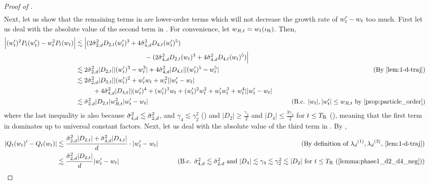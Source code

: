 \begin{proof}[Proof of ]
\begin{align}
\end{align}
Next, let us show that the remaining terms in  are lower-order terms which will not decrease the growth rate of $w_t' - w_t$ too much. First let us deal with the absolute value of the second term in . For convenience, let $w_{R, t} = w_t(\iota_{\textup{R}})$. Then,
\begin{align}
\Big|(\w_t')^2 P_t(\w_t') - \w_t^2 P_t(\w_t) \Big|
& \lesssim \Big| (2 \sigmaCoeffTwo^2 D_{2, t} (\w_t')^3 + 4 \sigmaCoeffFour^2 D_{4, t} (\w_t')^5 ) \\
& \nextlinespace\nextlinespace\nextlinespace\nextlinespace - (2 \sigmaCoeffFour^2 D_{2, t} (\w_t)^3 + 4 \sigmaCoeffFour^2 D_{4, t} (\w_t)^5 ) \Big| \\
& \lesssim 2 \sigmaCoeffTwo^2 |D_{2, t}| |(\w_t')^3 - \w_t^3| + 4 \sigmaCoeffFour^2 |D_{4, t}| |(\w_t')^5 - \w_t^5|
& \tag{By \Cref{lem:1-d-traj}} \\
& \lesssim 2 \sigmaCoeffTwo^2 |D_{2, t}| |(\w_t')^2 + \w_t' \w_t + \w_t^2| |\w_t' - \w_t| \\
& \nextlinespace + 4 \sigmaCoeffFour^2 |D_{4, t}| |(\w_t')^4 + (\w_t')^3 \w_t + (\w_t')^2 \w_t^2 + \w_t' \w_t^3 + \w_t^4| |\w_t' - \w_t| \label{eq:with_third_term} \\
& \lesssim \sigmaCoeffTwo^2 |D_{2, t}| \w_{R, t}^2 |\w_t' - \w_t|
& \tag{B.c. $|\w_t|, |\w_t'| \leq \w_{R, t}$ by \Cref{prop:particle_order}}
\end{align}
where the last inequality is also because $\hat{\sigma}_{4, d}^2 \lesssim \hat{\sigma}_{2, d}^2$, and $\gamma_4 \lesssim \gamma_2^2$ () and $|D_2| \geq \frac{\gamma_2}{2}$ and $|D_4| \leq \frac{3\gamma_4}{2}$ for $t \leq {T_{\textup{R}}}$ (), meaning that the first term in  dominates up to universal constant factors. Next, let us deal with the absolute value of the third term in . By ,
\begin{align}
|Q_t(\w_t)' - Q_t(\w_t)|
& \lesssim \frac{\sigmaCoeffTwo^2 |D_{2, t}| + \sigmaCoeffFour^2 |D_{4, t}|}{d} \cdot |\w_t' - \w_t|
& \tag{By definition of $\lambdaD^{(1)}, \lambdaD^{(3)}$, \Cref{lem:1-d-traj}} \\
& \lesssim \frac{\sigmaCoeffTwo^2 |D_{2, t}|}{d} |\w_t' - \w_t|
& \tag{B.c. $\sigmaCoeffFour^2 \lesssim \sigmaCoeffTwo^2$ and $|D_4| \lesssim \gamma_4 \lesssim \gamma_2^2 \lesssim |D_2|$ for $t \leq \TR$ (\Cref{lemma:phase1_d2_d4_neg})}

\end{align}
\end{proof}
